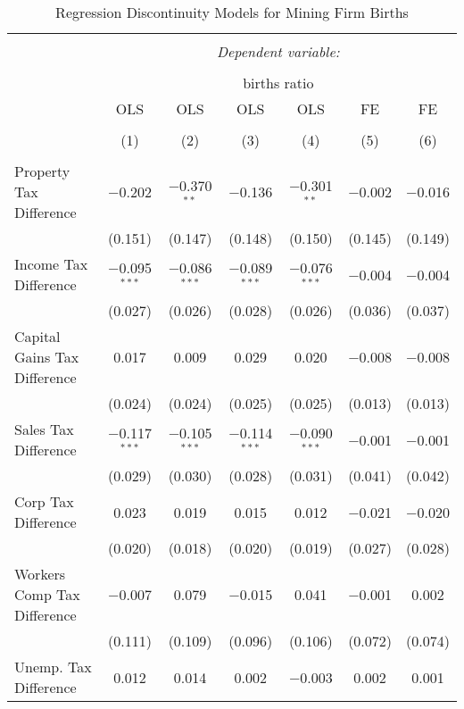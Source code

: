 
\begin{table}[!htbp] \centering 
  \caption{Regression Discontinuity Models for  Mining Firm Births} 
  \label{21rd} 
\footnotesize 
\begin{tabular}{@{\extracolsep{5pt}}lcccccc} 
\\[-1.8ex]\hline 
\hline \\[-1.8ex] 
 & \multicolumn{6}{c}{\textit{Dependent variable:}} \\ 
\cline{2-7} 
\\[-1.8ex] & \multicolumn{6}{c}{births ratio} \\ 
 & OLS & OLS & OLS & OLS & FE & FE \\ 
\\[-1.8ex] & (1) & (2) & (3) & (4) & (5) & (6)\\ 
\hline \\[-1.8ex] 
 Property Tax Difference & $-$0.202 & $-$0.370$^{**}$ & $-$0.136 & $-$0.301$^{**}$ & $-$0.002 & $-$0.016 \\ 
  & (0.151) & (0.147) & (0.148) & (0.150) & (0.145) & (0.149) \\ 
  Income Tax Difference & $-$0.095$^{***}$ & $-$0.086$^{***}$ & $-$0.089$^{***}$ & $-$0.076$^{***}$ & $-$0.004 & $-$0.004 \\ 
  & (0.027) & (0.026) & (0.028) & (0.026) & (0.036) & (0.037) \\ 
  Capital Gains Tax Difference & 0.017 & 0.009 & 0.029 & 0.020 & $-$0.008 & $-$0.008 \\ 
  & (0.024) & (0.024) & (0.025) & (0.025) & (0.013) & (0.013) \\ 
  Sales Tax Difference & $-$0.117$^{***}$ & $-$0.105$^{***}$ & $-$0.114$^{***}$ & $-$0.090$^{***}$ & $-$0.001 & $-$0.001 \\ 
  & (0.029) & (0.030) & (0.028) & (0.031) & (0.041) & (0.042) \\ 
  Corp Tax Difference & 0.023 & 0.019 & 0.015 & 0.012 & $-$0.021 & $-$0.020 \\ 
  & (0.020) & (0.018) & (0.020) & (0.019) & (0.027) & (0.028) \\ 
  Workers Comp Tax Difference & $-$0.007 & 0.079 & $-$0.015 & 0.041 & $-$0.001 & 0.002 \\ 
  & (0.111) & (0.109) & (0.096) & (0.106) & (0.072) & (0.074) \\ 
  Unemp. Tax Difference & 0.012 & 0.014 & 0.002 & $-$0.003 & 0.002 & 0.001 \\ 

\end{tabular}
\end{table}
